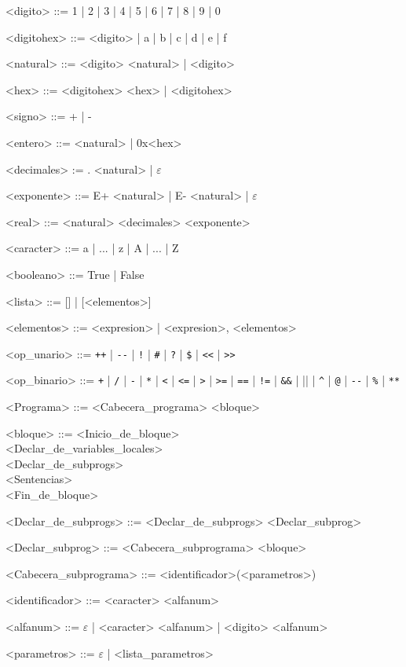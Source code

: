 \documentclass{scrartcl}
\begin{document}
\setlength{\grammarparsep}{4pt plus 1pt minus 1pt}
\begin{grammar}

<digito> ::= 1 | 2 | 3 | 4 | 5 | 6 | 7 | 8 | 9 | 0

<digitohex> ::= <digito> | a | b | c | d | e | f

<natural> ::= <digito> <natural> | <digito>

<hex> ::= <digitohex> <hex> | <digitohex>

<signo> ::= + | -

<entero> ::= <natural> | 0x<hex>

<decimales> := . <natural> | $\varepsilon$

<exponente> ::= E+ <natural> | E- <natural> | $\varepsilon$

<real> ::= <natural> <decimales> <exponente>

<caracter> ::= a | ... | z | A | ... | Z

<booleano> ::= True | False

<lista> ::= [] | [<elementos>]

<elementos> ::= <expresion> | <expresion>, <elementos>

<op_unario> ::= \verb|++| | \verb|--| | \verb|!| | \verb|#| | \verb|?| | \verb|$| | \verb|<<| | \verb|>>|

<op_binario> ::= \verb|+| | \verb|/| | \verb|-| | \verb|*| | \verb|<| | \verb|<=| | \verb|>| | \verb|>=| | \verb|==| | \verb|!=| | \verb|&&| | \verb|||| | \verb|^| | \verb|@| | \verb|--| | \verb|%| | \verb|**|

<Programa> ::= <Cabecera_programa> <bloque>

<bloque> ::= <Inicio_de_bloque> \\
 <Declar_de_variables_locales> \\
 <Declar_de_subprogs> \\
 <Sentencias> \\
 <Fin_de_bloque>

<Declar_de_subprogs> ::= <Declar_de_subprogs> <Declar_subprog>

<Declar_subprog> ::= <Cabecera_subprograma> <bloque>

<Cabecera_subprograma> ::= <identificador>(<parametros>)

<identificador> ::= <caracter> <alfanum>

<alfanum> ::= $\varepsilon$ | <caracter> <alfanum> | <digito> <alfanum>

<parametros> ::= $\varepsilon$ | <lista_parametros>


\end{grammar}
\end{document}

